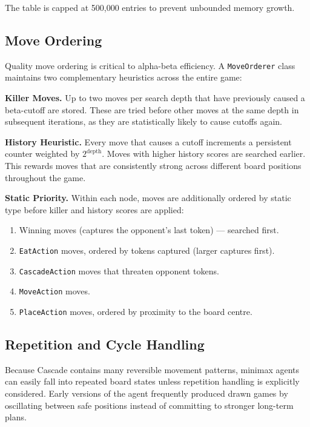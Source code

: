 \documentclass[10.5pt,a4paper]{article}
\begin{document}
The table is capped at 500,000 entries to prevent unbounded memory growth.

\subsection{Move Ordering}

Quality move ordering is critical to alpha-beta efficiency. A \texttt{MoveOrderer} class maintains two complementary heuristics across the entire game:

\textbf{Killer Moves.}
Up to two moves per search depth that have previously caused a beta-cutoff are stored. These are tried before other moves at the same depth in subsequent iterations, as they are statistically likely to cause cutoffs again.

\textbf{History Heuristic.}
Every move that causes a cutoff increments a persistent counter weighted by $2^{\text{depth}}$. Moves with higher history scores are searched earlier. This rewards moves that are consistently strong across different board positions throughout the game.

\textbf{Static Priority.}
Within each node, moves are additionally ordered by static type before killer and history scores are applied:

\begin{enumerate}[noitemsep]
    \item Winning moves (captures the opponent's last token) --- searched first.
    \item \texttt{EatAction} moves, ordered by tokens captured (larger captures first).
    \item \texttt{CascadeAction} moves that threaten opponent tokens.
    \item \texttt{MoveAction} moves.
    \item \texttt{PlaceAction} moves, ordered by proximity to the board centre.
\end{enumerate}

\subsection{Repetition and Cycle Handling}

Because Cascade contains many reversible movement patterns, minimax agents can easily fall into repeated board states unless repetition handling is explicitly considered. Early versions of the agent frequently produced drawn games by oscillating between safe positions instead of committing to stronger long-term plans.
\end{document}
